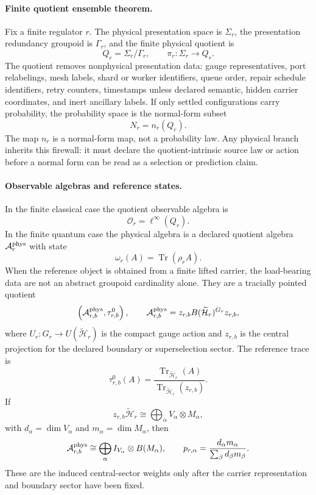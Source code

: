 \paragraph{Finite quotient ensemble theorem.}
Fix a finite regulator \(r\).  The physical presentation space is \(\Sigma_r\), the
presentation redundancy groupoid is \(\Gamma_r\), and the finite physical quotient is
\[
Q_r=\Sigma_r/\Gamma_r,\qquad \pi_r:\Sigma_r\to Q_r.
\]
The quotient removes nonphysical presentation data: gauge representatives, port relabelings, mesh
labels, shard or worker identifiers, queue order, repair schedule identifiers, retry counters,
timestamps unless declared semantic, hidden carrier coordinates, and inert ancillary labels.  If
only settled configurations carry probability, the probability space is the normal-form subset
\[
N_r=n_r(Q_r).
\]
The map \(n_r\) is a normal-form map, not a probability law. Any physical branch inherits
this firewall: it must declare the quotient-intrinsic source law or action before a normal form can
be read as a selection or prediction claim.

\paragraph{Observable algebras and reference states.}
In the finite classical case the quotient observable algebra is
\[
\mathcal O_r=\ell^\infty(Q_r).
\]
In the finite quantum case the physical algebra is a declared quotient algebra
\(\mathcal A^{\rm phys}_r\) with state
\[
\omega_r(A)=\operatorname{Tr}(\rho_r A).
\]
When the reference object is obtained from a finite lifted carrier, the load-bearing data are not
an abstract groupoid cardinality alone.  They are a tracially pointed quotient
\[
\left(\mathcal A^{\rm phys}_{r,b},\tau^0_{r,b}\right),
\qquad
\mathcal A^{\rm phys}_{r,b}
=
z_{r,b}B(\widetilde{\mathcal H}_r)^{G_r}z_{r,b},
\]
where \(U_r:G_r\to U(\widetilde{\mathcal H}_r)\) is the compact gauge action and \(z_{r,b}\) is
the central projection for the declared boundary or superselection sector.  The reference trace is
\[
\tau^0_{r,b}(A)
=
\frac{\operatorname{Tr}_{\widetilde{\mathcal H}_r}(A)}
{\operatorname{Tr}_{\widetilde{\mathcal H}_r}(z_{r,b})}.
\]
If
\[
z_{r,b}\widetilde{\mathcal H}_r
\cong
\bigoplus_\alpha V_\alpha\otimes M_\alpha,
\]
with \(d_\alpha=\dim V_\alpha\) and \(m_\alpha=\dim M_\alpha\), then
\[
\mathcal A^{\rm phys}_{r,b}
\cong
\bigoplus_\alpha I_{V_\alpha}\otimes B(M_\alpha),
\qquad
p_{r,\alpha}
=
\frac{d_\alpha m_\alpha}{\sum_\beta d_\beta m_\beta}.
\]
These are the induced central-sector weights only after the carrier representation and boundary
sector have been fixed.

